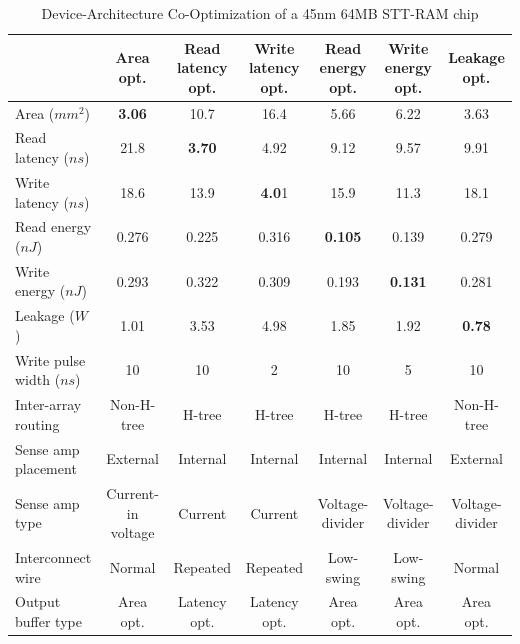 \begin{table}[t]
\centering
\caption{Device-Architecture Co-Optimization of a 45nm 64MB STT-RAM chip}
\label{tb:bigtable}
\begin{tabular}{| l | c | c | c | c | c | c |}
\hline\hline
& Area opt. & Read latency opt. & Write latency opt. & Read energy opt. & Write energy opt. & Leakage opt. \\
\hline
Area ($mm^2$) & \textbf{3.06} & 10.7 & 16.4 & 5.66 & 6.22 & 3.63 \\
\hline
Read latency ($ns$) & 21.8 & \textbf{3.70} & 4.92 & 9.12 & 9.57 &	9.91 \\
\hline
Write latency ($ns$) & 18.6	& 13.9	& \textbf{4.0}1	& 15.9	& 11.3	& 18.1 \\
\hline
Read energy ($nJ$) & 0.276	& 0.225	& 0.316	& \textbf{0.105}	& 0.139	& 0.279 \\
\hline
Write energy ($nJ$) & 0.293	& 0.322	& 0.309	& 0.193	& \textbf{0.131}	& 0.281\\
\hline
Leakage ($W$) & 1.01	& 3.53	& 4.98	& 1.85	& 1.92	& \textbf{0.78}\\
\hline\hline
Write pulse width ($ns$) & 10 & 10 & 2 & 10 & 5 & 10 \\
\hline
Inter-array routing & Non-H-tree & H-tree & H-tree & H-tree & H-tree & Non-H-tree \\
\hline
Sense amp placement & External & Internal & Internal & Internal & Internal & External \\
\hline
Sense amp type & Current-in voltage & Current & Current & Voltage-divider & Voltage-divider & Voltage-divider \\
\hline
Interconnect wire & Normal & Repeated & Repeated & Low-swing & Low-swing & Normal \\
\hline
Output buffer type & Area opt. & Latency opt. & Latency opt. & Area opt. & Area opt. & Area opt. \\
\hline\hline
\end{tabular}
\end{table}